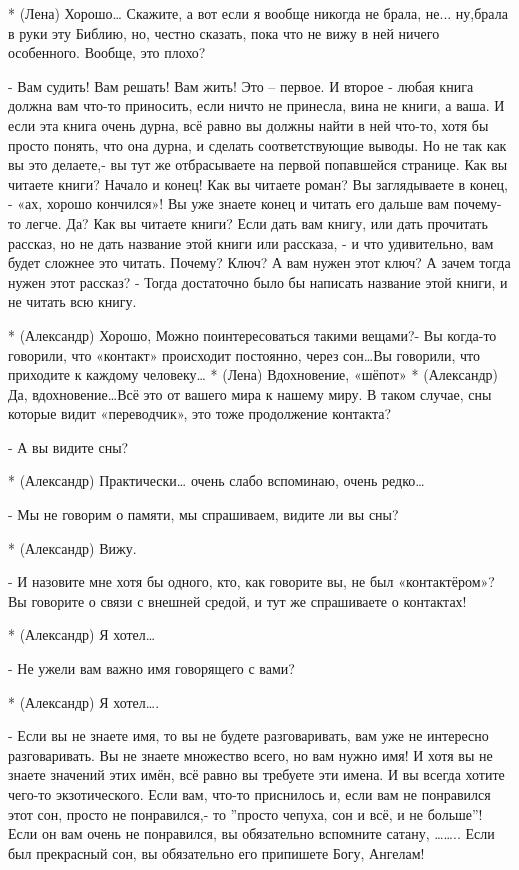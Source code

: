 * (Лена) Хорошо… Скажите, а вот если я вообще никогда не брала, не... ну,брала в руки эту Библию, но, честно сказать, пока что не вижу в ней ничего особенного. Вообще, это плохо?

- Вам судить! Вам решать! Вам жить! Это – первое. И второе - любая книга должна вам что-то приносить, если ничто не принесла, вина не книги, а ваша. И если эта книга очень дурна, всё равно вы должны найти в ней что-то, хотя бы просто понять, что она дурна, и сделать соответствующие выводы. Но не так как вы это делаете,- вы тут же отбрасываете на первой попавшейся странице. Как вы читаете книги? Начало и конец! Как вы читаете роман? Вы заглядываете в конец, - «ах, хорошо кончился»! Вы уже знаете конец и читать его дальше вам почему-то легче. Да? Как вы читаете книги? Если дать вам книгу, или дать прочитать рассказ, но не дать название этой книги или рассказа, - и что удивительно, вам будет сложнее это читать. Почему? Ключ? А вам нужен этот ключ? А зачем тогда нужен этот рассказ? - Тогда достаточно было бы написать название этой книги, и не читать всю книгу.

* (Александр) Хорошо, Можно поинтересоваться такими вещами?- Вы когда-то говорили, что «контакт» происходит постоянно, через сон…Вы говорили, что  приходите к каждому человеку…
* (Лена) Вдохновение, «шёпот»
* (Александр) Да, вдохновение…Всё это от вашего мира к нашему миру. В таком случае, сны которые видит «переводчик», это тоже продолжение контакта?

- А вы видите сны?

* (Александр) Практически… очень слабо вспоминаю, очень редко…

- Мы не говорим о памяти, мы спрашиваем, видите ли вы сны?

* (Александр) Вижу.

- И назовите мне хотя бы одного, кто, как говорите вы, не был «контактёром»? Вы говорите о связи с внешней средой, и тут же спрашиваете о контактах! 

* (Александр) Я хотел…

- Не ужели вам важно имя говорящего с вами?

* (Александр) Я хотел….

- Если вы не знаете имя, то вы не будете разговаривать, вам уже не интересно разговаривать.  Вы не знаете множество всего, но вам нужно имя! И хотя вы не знаете значений этих имён, всё равно вы требуете эти имена. И вы всегда хотите чего-то экзотического. Если вам, что-то приснилось и, если вам не понравился этот сон, просто не понравился,- то ”просто чепуха, сон и всё, и не больше”! Если он вам очень не понравился, вы обязательно вспомните сатану, …….. Если был прекрасный сон, вы обязательно его припишете Богу, Ангелам!

